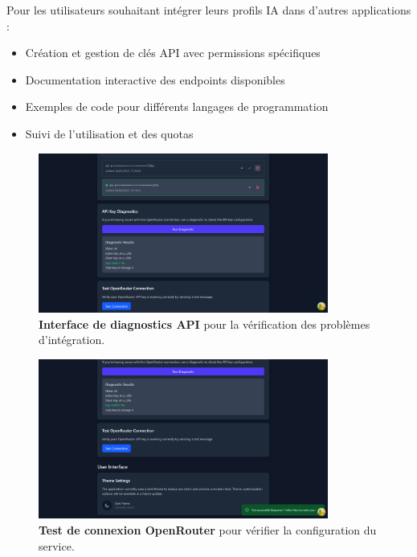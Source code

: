 Pour les utilisateurs souhaitant intégrer leurs profils IA dans d'autres applications :

\begin{itemize}
  \item Création et gestion de clés API avec permissions spécifiques
  \item Documentation interactive des endpoints disponibles
  \item Exemples de code pour différents langages de programmation
  \item Suivi de l'utilisation et des quotas
\end{itemize}

\begin{figure}[H]
  \centering
  \includegraphics[width=0.85\textwidth,keepaspectratio]{pfe-pics/ai-profile-creation/api_diagnostics.png}
  \caption{\textbf{Interface de diagnostics API} pour la vérification des problèmes d'intégration.}
  \label{fig:api_diagnostics}
\end{figure}

\begin{figure}[H]
  \centering
  \includegraphics[width=0.85\textwidth,keepaspectratio]{pfe-pics/ai-profile-creation/test_openRouter_connection.png}
  \caption{\textbf{Test de connexion OpenRouter} pour vérifier la configuration du service.}
  \label{fig:openrouter_test}
\end{figure}


